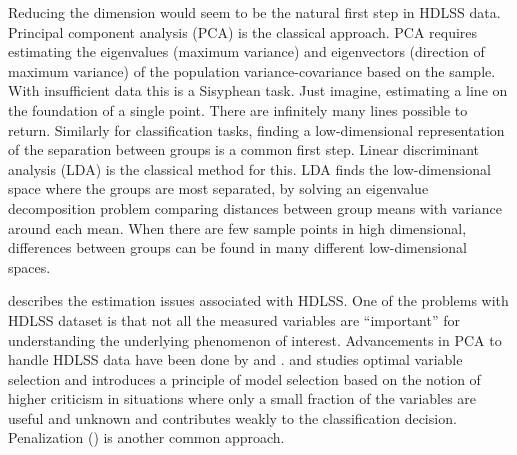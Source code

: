 
Reducing the dimension would seem to be the natural first step in HDLSS data. Principal component analysis (PCA) is the classical approach. PCA requires estimating the eigenvalues (maximum variance) and eigenvectors (direction of maximum variance) of the population variance-covariance based on the sample. With insufficient data this is a Sisyphean task. Just imagine, estimating a line on the foundation of a single point. There are infinitely many lines possible to return. Similarly for classification tasks, finding a low-dimensional representation of the separation between groups is a common first step. Linear discriminant analysis (LDA) is the classical method for this. LDA finds the low-dimensional space where the groups are most separated, by solving an eigenvalue decomposition problem comparing distances between group means with variance around each mean. When there are few sample points in high dimensional, differences between groups can be found in many different low-dimensional spaces. 




\cite{marron:2007} describes the estimation issues associated with HDLSS.  
One of the problems with HDLSS dataset is that not all the measured variables are ``important'' for understanding the underlying phenomenon of interest. Advancements in PCA to handle HDLSS data have been done by \cite{marron:2011} and \cite{yata:2010}. \cite{donoho:2009} and \cite{donoho:2008} studies optimal variable selection and introduces a principle of model selection based on the notion of higher criticism in situations where only a small fraction of the variables are useful and unknown and contributes weakly to the classification decision. Penalization (\cite{witten:2011}) is another common approach.


